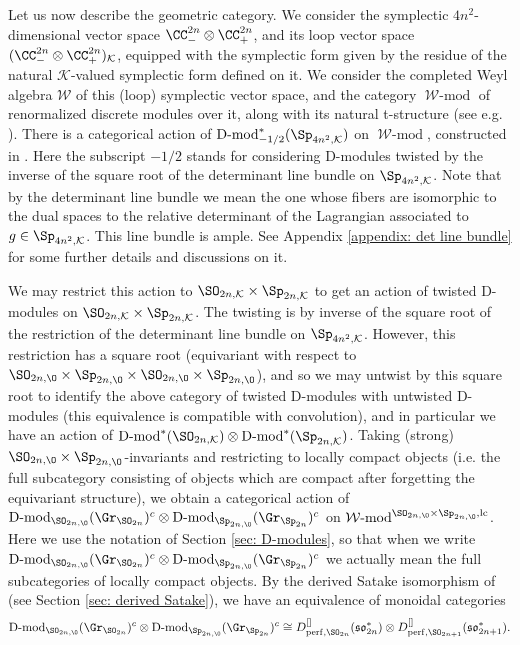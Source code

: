 \documentclass[11pt]{article}
\begin{document}
Let us now describe the geometric category.
We consider the symplectic $4n^2$-dimensional vector space $\CC_-^{2n}\otimes \CC_+^{2n}$, and its loop vector space $(\CC_-^{2n}\otimes \CC_+^{2n})_\mathcal{K}$, equipped with the symplectic form given by the residue of the natural $\mathcal{K}$-valued symplectic form defined on it. We consider the completed Weyl algebra $\mathcal{W}$ of this (loop) symplectic vector space, and the category $\operatorname{\mathcal{W}-\mathrm{mod}}$ of renormalized discrete modules over it, along with its natural t-structure (see e.g. \cite[§2.1]{BFKT}).
There is a categorical action of $\operatorname{D-mod}_{-1/2}^*(\Sp_{4n^2,\mathcal{K}})$ on $\operatorname{\mathcal{W}-\mathrm{mod}}$, constructed in \cite[Lemma 2.4.1]{BDFRT}. Here the subscript $-1/2$ stands for considering D-modules twisted by the inverse of the square root of the determinant line bundle on $\Sp_{4n^2,\mathcal{K}}$. Note that by the determinant line bundle we mean the one whose fibers are isomorphic to the dual spaces to the relative determinant of the Lagrangian associated to $g\in \Sp_{4n^2,\mathcal{K}}$. This line bundle is ample. See Appendix \ref{appendix: det line bundle} for some further details and discussions on it.

We may restrict this action to $\SO_{2n,\mathcal{K}}\times \Sp_{2n, \mathcal{K}}$ to get an action of twisted D-modules on $\SO_{2n,\mathcal{K}}\times \Sp_{2n, \mathcal{K}}$. The twisting is by inverse of the square root of the restriction of the determinant line bundle on $\Sp_{4n^2,\mathcal{K}}$. However, this restriction has a square root (equivariant with respect to $\SO_{2n,\O}\times \Sp_{2n, \O}\times \SO_{2n,\O} \times \Sp_{2n, \O}$), and so we may untwist by this square root to identify the above category of twisted D-modules with untwisted D-modules (this equivalence is compatible with convolution), and in particular we have an action of $\operatorname{D-mod}^*(\SO_{2n,\mathcal{K}})\otimes \operatorname{D-mod}^*(\Sp_{2n, \mathcal{K}})$.
Taking (strong) $\SO_{2n,\O}\times \Sp_{2n,\O}$-invariants and restricting to locally compact objects (i.e. the full subcategory consisting of objects which are compact after forgetting the equivariant structure), we obtain a categorical action of
$\operatorname{D-mod}_{\SO_{2n,\O}}(\Gr_{\SO_{2n}})^c \otimes \operatorname{D-mod}_{\Sp_{2n,\O}}(\Gr_{\Sp_{2n}})^c$ on $\operatorname{\mathcal{W}-\mathrm{mod}}^{\SO_{2n,\O}\times \Sp_{2n,\O},\mathrm{lc}}$.
Here we use the notation of Section \ref{sec: D-modules}, so that when we write $\operatorname{D-mod}_{\SO_{2n,\O}}(\Gr_{\SO_{2n}})^c \otimes \operatorname{D-mod}_{\Sp_{2n,\O}}(\Gr_{\Sp_{2n}})^c$ we actually mean the full subcategories of locally compact objects.
By the derived Satake isomorphism of \cite{BF} (see Section \ref{sec: derived Satake}), we have an equivalence of monoidal categories
$$\operatorname{D-mod}_{\SO_{2n,\O}}(\Gr_{\SO_{2n}})^c \otimes \operatorname{D-mod}_{\Sp_{2n,\O}}(\Gr_{\Sp_{2n}})^c\cong D_{\mathrm{perf},\SO_{2n}}^{[]}(\mathfrak{so}^*_{2n})\otimes D_{\mathrm{perf},\SO_{2n+1}}^{[]}(\mathfrak{so}^*_{2n+1}).$$
\end{document}

